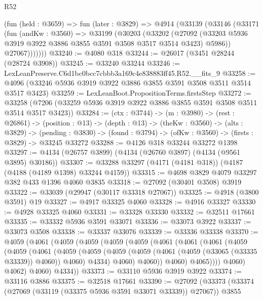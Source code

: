 \begin{lexlean}{R52}
\begin{coremodule}
      (fun (held : @3659) =>
      fun (later : @3829) =>
      @4914
        (@33139
          (@33146
            (@33171
              (fun (andKw : @3560) =>
              @33199
                (@30203
                  (@33202
                    (@27092
                      (@33203 @5936 @3919 @3922 @3886 @3855 @3591 @3508 @3517 @3514 @3423)
                      @5986))
                  @27067)))))))
@33240 := @4080 @318
@33244 := @26017 (@3451 @28244 (@28724 @3908))
@33245 := @33240 @33244
@33246 := LexLeanPreserve.C6d1bc0bcc7cbbb3a169c4e838883ff45.R52.__fits_9
@33258 := @4096 (@33246 @5936 @3919 @3922 @3886 @3855 @3591 @3508 @3511 @3514 @3517 @3423)
@33259 := LexLeanBoot.PropositionTerms.firstsStep
@33272 := @33258 (@7206 (@33259 @5936 @3919 @3922 @3886 @3855 @3591 @3508 @3511 @3514 @3517 @3423))
@33284 := (ctx : @3744) ->
  (m : @3980) ->
  (rest : @26861) ->
  (position : @13) ->
  (depth : @13) ->
  (theKw : @3560) ->
  (alts : @3829) ->
  (pending : @3830) -> (found : @3794) -> (ofKw : @3560) -> (firsts : @3829) -> @33245 @33272
@33288 := @4126 @318 @33244 @33272 @1398
@33297 := @4134 (@26757 @3899) (@4134 (@26760 @3897) (@4134 (@9561 @3895) @30186))
@33307 := @33288 @33297 (@4171 (@4181 @318)) (@4187 (@4188 (@4189 @1398) @33244 @4159))
@33315 := @4698 @3829 @4079 @33297 @382 @433 @1396 @4060 @3835
@33318 := @27092 (@30401 @3508) @3919
@33322 := @33039 (@29947 (@30117 @33318 @27067))
@33325 := @4918 (@3800 @3591) @19
@33327 := @4917 @33325 @4060
@33328 := @4916 @33327
@33330 := @4928 @33325 @4060
@33331 := @33328 @33330
@33332 := @32511 @17661
@33335 := @33332 @5936 @3591 @33071
@33336 := @33073 @3922
@33337 := @33073 @3508
@33338 := @33337 @33076
@33339 := @33336 @33338
@33370 := @4059
    (@4061
      (@4059
        (@4059
          (@4059
            (@4059
              (@4061
                (@4061
                  (@4061
                    (@4059
                      (@4059
                        (@4061
                          (@4059
                            (@4059
                              (@4059
                                (@4059 (@4061 (@4059 (@33065 (@33335 @33339)) @4060)) @4060)
                                @4334)
                              @4060)
                            @4060))
                        @4060)
                      @4065))))
              @4060)
            @4062)
          @4060)
        @4334))
@33373 := @33110 @5936 @3919 @3922
@33374 := @33116 @3886
@33375 := @32518 @17661
@33390 := @27092
    (@33373
      (@33374 (@27069 (@33119 (@33375 @5936 @3591 @33071 @33339)) @27067))
      @3855

\end{coremodule}
\end{lexlean}
